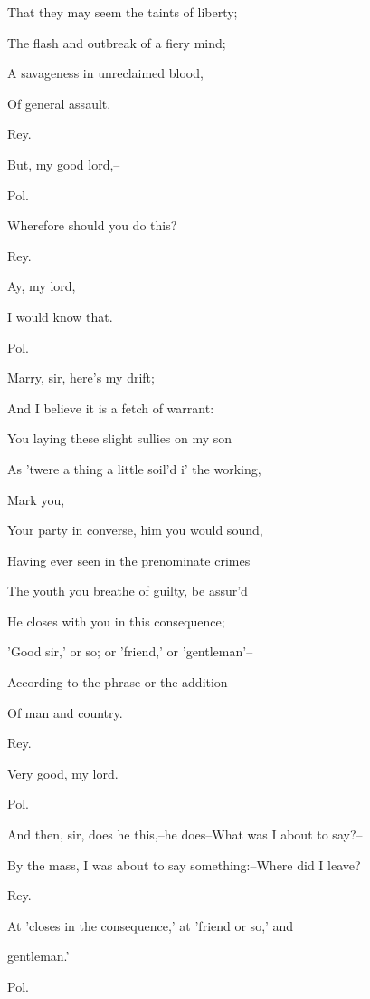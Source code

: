 \documentclass[12pt]{book}
\begin{document}
That they may seem the taints of liberty;

The flash and outbreak of a fiery mind;

A savageness in unreclaimed blood,

Of general assault.



Rey.

But, my good lord,--



Pol.

Wherefore should you do this?



Rey.

Ay, my lord,

I would know that.



Pol.

Marry, sir, here's my drift;

And I believe it is a fetch of warrant:

You laying these slight sullies on my son

As 'twere a thing a little soil'd i' the working,

Mark you,

Your party in converse, him you would sound,

Having ever seen in the prenominate crimes

The youth you breathe of guilty, be assur'd

He closes with you in this consequence;

'Good sir,' or so; or 'friend,' or 'gentleman'--

According to the phrase or the addition

Of man and country.



Rey.

Very good, my lord.



Pol.

And then, sir, does he this,--he does--What was I about to say?--

By the mass, I was about to say something:--Where did I leave?



Rey.

At 'closes in the consequence,' at 'friend or so,' and

gentleman.'



Pol.
\end{document}
